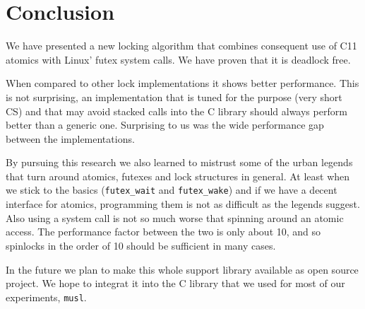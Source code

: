 \documentclass{sig-alternate-05-2015}
\begin{document}
\section{Conclusion}
\label{sec-5}

We have presented a new locking algorithm that combines consequent use
of C11 atomics with Linux' futex system calls. We have proven that it
is deadlock free.

When compared to other lock implementations it shows better
performance. This is not surprising, an implementation that is tuned
for the purpose (very short CS) and that may avoid stacked calls into
the C library should always perform better than a generic one.
Surprising to us was the wide performance gap between the
implementations.

By pursuing this research we also learned to mistrust some of the
urban legends that turn around atomics, futexes and lock structures in
general. At least when we stick to the basics (\texttt{futex\_wait} and
\texttt{futex\_wake}) and if we have a decent interface for atomics,
programming them is not as difficult as the legends suggest. Also
using a system call is not so much worse that spinning around an
atomic access. The performance factor between the two is only about
10, and so spinlocks in the order of 10 should be sufficient in many
cases.

In the future we plan to make this whole support library available as
open source project. We hope to integrat it into the C library that we
used for most of our experiments, \texttt{musl}.



\clearpage


\end{document}
